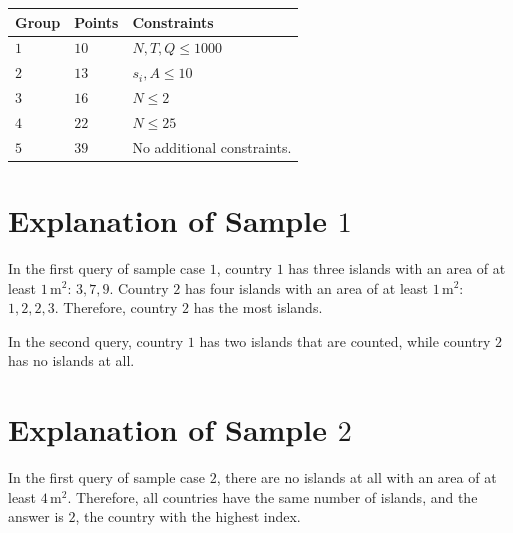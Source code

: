 \noindent
\begin{tabular}{| l | l | p{12cm} |}
  \hline
  \textbf{Group} & \textbf{Points} & \textbf{Constraints} \\ \hline
  $1$    & $10$       & $N, T, Q \leq 1000$ \\ \hline
  $2$    & $13$       & $s_i, A \leq 10$ \\ \hline
  $3$    & $16$       & $N \leq 2$ \\ \hline
  $4$    & $22$       & $N \leq 25$ \\ \hline
  $5$    & $39$       & No additional constraints. \\ \hline
\end{tabular}

\section*{Explanation of Sample $1$}

In the first query of sample case $1$, country $1$ has three islands with an area of at least $1\,\text{m}^2$: $3, 7, 9$.
Country $2$ has four islands with an area of at least $1\,\text{m}^2$: $1, 2, 2, 3$.
Therefore, country $2$ has the most islands.

In the second query, country $1$ has two islands that are counted, while country $2$ has no islands at all.

\section*{Explanation of Sample $2$}

In the first query of sample case $2$, there are no islands at all with an area of at least $4\,\text{m}^2$.
Therefore, all countries have the same number of islands, and the answer is $2$, the country with the highest index.

